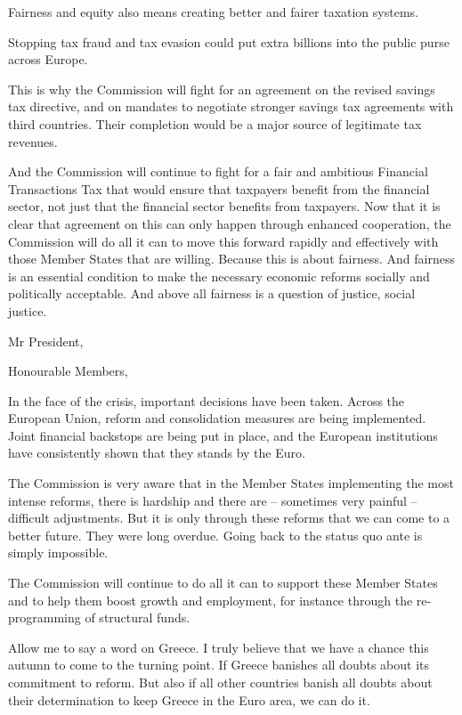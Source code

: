 \documentclass[a4paper,11pt]{article}
\begin{document}
Fairness and equity also means creating better and fairer taxation systems.

Stopping tax fraud and tax evasion could put extra billions into the public purse across Europe.

This is why the Commission will fight for an agreement on the revised savings tax directive, and on mandates to negotiate stronger savings tax agreements with third countries. Their completion would be a major source of legitimate tax revenues.

And the Commission will continue to fight for a fair and ambitious Financial Transactions Tax that would ensure that taxpayers benefit from the financial sector, not just that the financial sector benefits from taxpayers. Now that it is clear that agreement on this can only happen through enhanced cooperation, the Commission will do all it can to move this forward rapidly and effectively with those Member States that are willing. Because this is about fairness. And fairness is an essential condition to make the necessary economic reforms socially and politically acceptable. And above all fairness is a question of justice, social justice.

Mr President,

Honourable Members,

In the face of the crisis, important decisions have been taken. Across the European Union, reform and consolidation measures are being implemented. Joint financial backstops are being put in place, and the European institutions have consistently shown that they stands by the Euro.

The Commission is very aware that in the Member States implementing the most intense reforms, there is hardship and there are – sometimes very painful – difficult adjustments. But it is only through these reforms that we can come to a better future. They were long overdue. Going back to the status quo ante is simply impossible.

The Commission will continue to do all it can to support these Member States and to help them boost growth and employment, for instance through the re-programming of structural funds.

Allow me to say a word on Greece. I truly believe that we have a chance this autumn to come to the turning point. If Greece banishes all doubts about its commitment to reform. But also if all other countries banish all doubts about their determination to keep Greece in the Euro area, we can do it.
\end{document}
